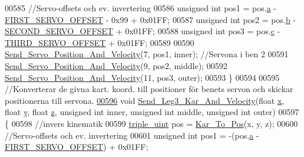 \begin{DoxyCode}
00585     \textcolor{comment}{//Servo-offsets och ev. invertering }
00586     \textcolor{keywordtype}{unsigned} \textcolor{keywordtype}{int} pos1 = pos.\hyperlink{structtriple__uint_a0ea8a85723620c90be9fd2a693f12a59}{a} - \hyperlink{servo___u_a_r_t_8c_a4c437d01d2f060ec86c16ed5e76efe45}{FIRST\_SERVO\_OFFSET} - 0x99 + 0x01FF;
00587     \textcolor{keywordtype}{unsigned} \textcolor{keywordtype}{int} pos2 = pos.\hyperlink{structtriple__uint_a790d5baa17ec7aaf7bb49750a16e9c29}{b} - \hyperlink{servo___u_a_r_t_8c_acb02dedbe5ff19694bdb5b2ddf61664a}{SECOND\_SERVO\_OFFSET} + 0x01FF;
00588     \textcolor{keywordtype}{unsigned} \textcolor{keywordtype}{int} pos3 = pos.\hyperlink{structtriple__uint_a6ce17b018c47d0f1d0e53a458f741ad3}{c} - \hyperlink{servo___u_a_r_t_8c_ac2f065c44b617c91ea7f4237e8ead729}{THIRD\_SERVO\_OFFSET} + 0x01FF;
00589     
00590     \hyperlink{servo___u_a_r_t_8c_aef28545296037ecc0350638a407a680f}{Send\_Servo\_Position\_And\_Velocity}(7, pos1, inner); \textcolor{comment}{//Servona i ben 2}
00591     \hyperlink{servo___u_a_r_t_8c_aef28545296037ecc0350638a407a680f}{Send\_Servo\_Position\_And\_Velocity}(9, pos2, middle);
00592     \hyperlink{servo___u_a_r_t_8c_aef28545296037ecc0350638a407a680f}{Send\_Servo\_Position\_And\_Velocity}(11, pos3, outer);
00593 \}
00594 
00595 \textcolor{comment}{//Konverterar de givna kart. koord. till positioner för benets servon och skickar positionerna till
       servona.}
\hypertarget{servo___u_a_r_t_8c_source.tex_l00596}{}\hyperlink{servo___u_a_r_t_8h_a15260e1c5159c1047ca8ec867a8fc56c}{00596} \textcolor{keywordtype}{void} \hyperlink{servo___u_a_r_t_8c_a15260e1c5159c1047ca8ec867a8fc56c}{Send\_Leg3\_Kar\_And\_Velocity}(\textcolor{keywordtype}{float} \hyperlink{sensor_8h_a6c4b361d72eb3767ba424ac9a6ecf52b}{x}, \textcolor{keywordtype}{float} \hyperlink{sensor_8h_a0ed6a908288e0cd87f79c1b5ab56d07c}{y}, \textcolor{keywordtype}{float} 
      \hyperlink{over__hinder_8c_af73583b1e980b0aa03f9884812e9fd4d}{z}, \textcolor{keywordtype}{unsigned} \textcolor{keywordtype}{int} inner, \textcolor{keywordtype}{unsigned} \textcolor{keywordtype}{int} middle, \textcolor{keywordtype}{unsigned} \textcolor{keywordtype}{int} outer)
00597 \{
00598     \textcolor{comment}{//invers kinematik }
00599     \hyperlink{structtriple__uint}{triple\_uint} pos = \hyperlink{invers__kinematik_8c_a68f82386196ad991ed54fb9796d90f7c}{Kar\_To\_Pos}(x, y, z);
00600     \textcolor{comment}{//Servo-offsets och ev. invertering }
00601     \textcolor{keywordtype}{unsigned} \textcolor{keywordtype}{int} pos1 = -(pos.\hyperlink{structtriple__uint_a0ea8a85723620c90be9fd2a693f12a59}{a} - \hyperlink{servo___u_a_r_t_8c_a4c437d01d2f060ec86c16ed5e76efe45}{FIRST\_SERVO\_OFFSET}) + 0x01FF;

\end{DoxyCode}
